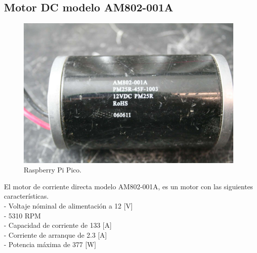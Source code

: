 \documentclass[12pt]{book} %
\begin{document}
\subsection{Motor DC modelo AM802-001A}

\begin{figure}[H]
	\begin{center}
	\includegraphics[scale=0.2]{AM801.jpg}
	\caption{Raspberry Pi Pico.} 
	\end{center}
	\end{figure}
	
El motor de corriente directa modelo AM802-001A, es un motor con las siguientes características.\\
- Voltaje nóminal de alimentación a 12 [V]\\
- 5310 RPM\\
- Capacidad de corriente de 133 [A]\\
- Corriente de arranque de 2.3 [A]\\
- Potencia máxima de 377 [W]\\
\end{document}
